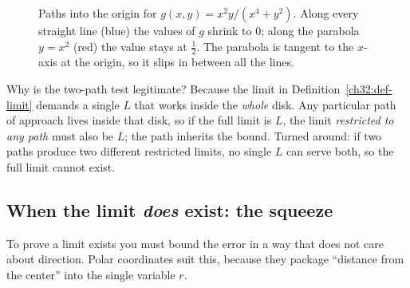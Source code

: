\begin{figure}[htbp]
\centering
{}
\caption{Paths into the origin for $g(x,y)=x^2y/(x^4+y^2)$. Along every straight line (blue)
the values of $g$ shrink to $0$; along the parabola $y=x^2$ (red) the value stays at
$\tfrac12$. The parabola is tangent to the $x$-axis at the origin, so it slips in between all
the lines.}
\label{ch32:fig-parabola-path}
\end{figure}

\begin{whybox}
Why is the two-path test legitimate? Because the limit in
Definition~\ref{ch32:def-limit} demands a single $L$ that works inside the \emph{whole} disk.
Any particular path of approach lives inside that disk, so if the full limit is $L$, the limit
\emph{restricted to any path} must also be $L$; the path inherits the bound. Turned around:
if two paths produce two different restricted limits, no single $L$ can serve both, so the full
limit cannot exist.
\end{whybox}

\subsection*{When the limit \emph{does} exist: the squeeze}

To prove a limit exists you must bound the error in a way that does not care about direction.
Polar coordinates suit this, because they package ``distance from the center'' into the
single variable $r$.

